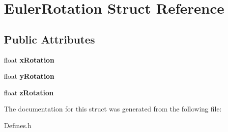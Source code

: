 \hypertarget{structEulerRotation}{
\section{EulerRotation Struct Reference}
\label{structEulerRotation}
}
\subsection*{Public Attributes}
\begin{DoxyCompactItemize}
\item 
\hypertarget{structEulerRotation_adec64a59ed85f868f94ece87b0efee14}{
float {\bfseries xRotation}}
\label{structEulerRotation_adec64a59ed85f868f94ece87b0efee14}

\item 
\hypertarget{structEulerRotation_a5b759dc768c2ef20e03bc0efc433cb25}{
float {\bfseries yRotation}}
\label{structEulerRotation_a5b759dc768c2ef20e03bc0efc433cb25}

\item 
\hypertarget{structEulerRotation_ad3e12848cb3909ef9abb308d89107272}{
float {\bfseries zRotation}}
\label{structEulerRotation_ad3e12848cb3909ef9abb308d89107272}

\end{DoxyCompactItemize}


The documentation for this struct was generated from the following file:\begin{DoxyCompactItemize}
\item 
Defines.h\end{DoxyCompactItemize}
